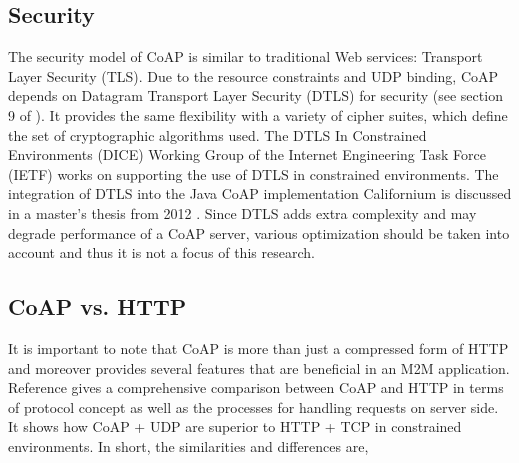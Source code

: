 \subsection{Security}\label{security}

The security model of CoAP is similar to traditional Web services: Transport Layer Security (TLS). Due to the resource constraints and UDP binding, CoAP depends on Datagram Transport Layer Security (DTLS) for security (see section 9 of \cite{coap_protocol}). It provides the same flexibility with a variety of cipher suites, which define the set of cryptographic algorithms used. The DTLS In Constrained Environments (DICE) Working Group of the Internet Engineering Task Force (IETF) works on supporting the use of DTLS in constrained environments.  The integration of DTLS into the Java CoAP implementation Californium \cite{californium} is discussed in a master's thesis from 2012 \cite{jucker2012securing}. Since DTLS adds extra complexity and may degrade performance of a CoAP server, various optimization should be taken into account and thus it is not a focus of this research.

\subsection{CoAP vs. HTTP}\label{vs_HTTP}

It is important to note that CoAP is more than just a compressed form of HTTP and moreover provides several features that are beneficial in an M2M application. Reference \cite{lanter2013scalability} gives a comprehensive comparison between CoAP and HTTP in terms of protocol concept as well as the processes for handling requests on server side. It shows how CoAP + UDP are superior to HTTP + TCP in constrained environments. In short, the similarities and differences are,

